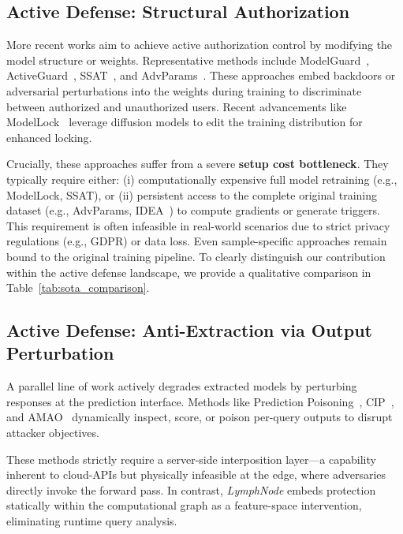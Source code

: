 \documentclass[conference]{IEEEtran}
\begin{document}
\subsection{Active Defense: Structural Authorization}
More recent works aim to achieve active authorization control by modifying the model structure or weights. Representative methods include ModelGuard~\cite{chen2021model}, ActiveGuard~\cite{xue2023activeguard}, SSAT~\cite{xue2024ssat}, and AdvParams~\cite{xue2021advparams}. These approaches embed backdoors or adversarial perturbations into the weights during training to discriminate between authorized and unauthorized users. Recent advancements like ModelLock~\cite{gong2024modellock} leverage diffusion models to edit the training distribution for enhanced locking.

Crucially, these approaches suffer from a severe \textbf{setup cost bottleneck}. They typically require either: (i) computationally expensive full model retraining (e.g., ModelLock, SSAT), or (ii) persistent access to the complete original training dataset (e.g., AdvParams, IDEA~\cite{chakraborty2020hpnn}) to compute gradients or generate triggers. This requirement is often infeasible in real-world scenarios due to strict privacy regulations (e.g., GDPR) or data loss. Even sample-specific approaches remain bound to the original training pipeline. To clearly distinguish our contribution within the active defense landscape, we provide a qualitative comparison in Table~\ref{tab:sota_comparison}. 

\subsection{Active Defense: Anti-Extraction via Output Perturbation}
\label{sec:related_anti_extraction}

A parallel line of work actively degrades extracted models by perturbing responses at the prediction interface. Methods like Prediction Poisoning~\cite{orekondy2020prediction}, CIP~\cite{zhang2023cip}, and AMAO~\cite{jiang2024amao} dynamically inspect, score, or poison per-query outputs to disrupt attacker objectives.

These methods strictly require a server-side interposition layer---a capability inherent to cloud-APIs but physically infeasible at the edge, where adversaries directly invoke the forward pass. In contrast, \textit{LymphNode} embeds protection statically within the computational graph as a feature-space intervention, eliminating runtime query analysis.
\end{document}
